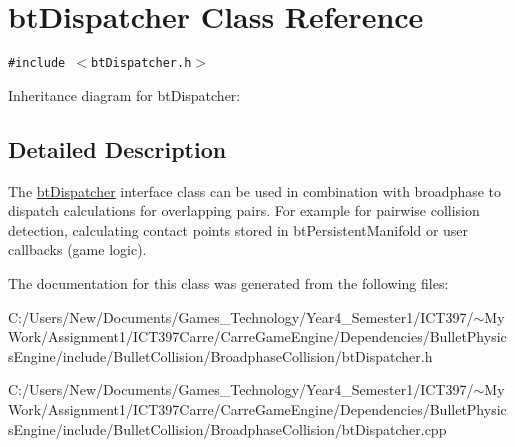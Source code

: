 \hypertarget{classbt_dispatcher}{
\section{btDispatcher Class Reference}
\label{classbt_dispatcher}
}
{\tt \#include $<$btDispatcher.h$>$}

Inheritance diagram for btDispatcher:

\subsection{Detailed Description}
The \hyperlink{classbt_dispatcher}{btDispatcher} interface class can be used in combination with broadphase to dispatch calculations for overlapping pairs. For example for pairwise collision detection, calculating contact points stored in btPersistentManifold or user callbacks (game logic). 

The documentation for this class was generated from the following files:\begin{CompactItemize}
\item 
C:/Users/New/Documents/Games\_\-Technology/Year4\_\-Semester1/ICT397/$\sim$My Work/Assignment1/ICT397Carre/CarreGameEngine/Dependencies/BulletPhysicsEngine/include/BulletCollision/BroadphaseCollision/btDispatcher.h\item 
C:/Users/New/Documents/Games\_\-Technology/Year4\_\-Semester1/ICT397/$\sim$My Work/Assignment1/ICT397Carre/CarreGameEngine/Dependencies/BulletPhysicsEngine/include/BulletCollision/BroadphaseCollision/btDispatcher.cpp\end{CompactItemize}

